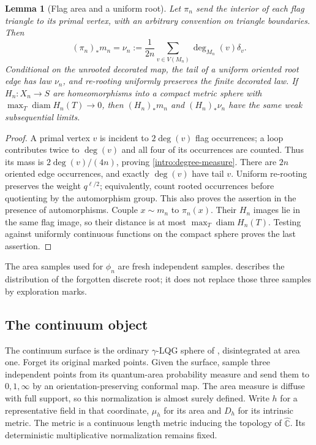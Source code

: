 \documentclass[11pt]{article}
\numberwithin{equation}{section}
\newtheorem{lemma}[theorem]{Lemma}
\theoremstyle{definition}
\theoremstyle{remark}
\newcommand{\1}{\mathbf 1}
\begin{document}
\begin{lemma}[Flag area and a uniform root]\label{intro:root-flag}
Let $\pi_n$ send the interior of each flag triangle to its primal
vertex, with an arbitrary convention on triangle boundaries. Then
\begin{equation}\label{intro:degree-measure}
 (\pi_n)_*m_n
 =\nu_n:=\frac1{2n}\sum_{v\in V(M_n)}\deg_{M_n}(v)\delta_v.
\end{equation}
Conditional on the unrooted decorated map, the tail of a uniform
oriented root edge has law $\nu_n$, and re-rooting uniformly preserves
the finite decorated law. If $H_n:X_n\to S$ are homeomorphisms into
a compact metric sphere with
$\max_T\operatorname{diam} H_n(T)\to0$, then $(H_n)_*m_n$ and
$(H_n)_*\nu_n$ have the same weak subsequential limits.
\end{lemma}

\begin{proof}
A primal vertex $v$ is incident to $2\deg(v)$ flag occurrences;
a loop contributes twice to $\deg(v)$ and all four of its occurrences
are counted. Thus its mass is $2\deg(v)/(4n)$, proving
\eqref{intro:degree-measure}. There are $2n$ oriented edge
occurrences, and exactly $\deg(v)$ have tail $v$. Uniform re-rooting
preserves the weight $q^{\ell/2}$; equivalently, count rooted
occurrences before quotienting by the automorphism group. This also
proves the assertion in the presence of automorphisms.
Couple $x\sim m_n$ to $\pi_n(x)$. Their $H_n$ images lie in the
same flag image, so their distance is at most
$\max_T\operatorname{diam} H_n(T)$. Testing against uniformly continuous
functions on the compact sphere proves the last assertion.
\end{proof}

The area samples used for $\phi_n$ are fresh independent samples.
 describes the distribution of the forgotten
discrete root; it does not replace those three samples by exploration
marks.

\subsection{The continuum object}

The continuum surface is the ordinary $\gamma$-LQG sphere of
\citet[Definition~4.21(ii)]{DMSMating}, disintegrated at area one. Forget
its original marked points. Given the surface, sample three independent
points from its quantum-area probability measure and send them to
$0,1,\infty$ by an orientation-preserving conformal map. The area
measure is diffuse with full support, so this normalization is almost
surely defined. Write $h$ for a representative field in that
coordinate, $\mu_h$ for its area and $D_h$ for its intrinsic metric.
The metric is a continuous length metric inducing the topology of
$\widehat{\mathbb C}$. Its deterministic multiplicative normalization remains
fixed.
\end{document}
